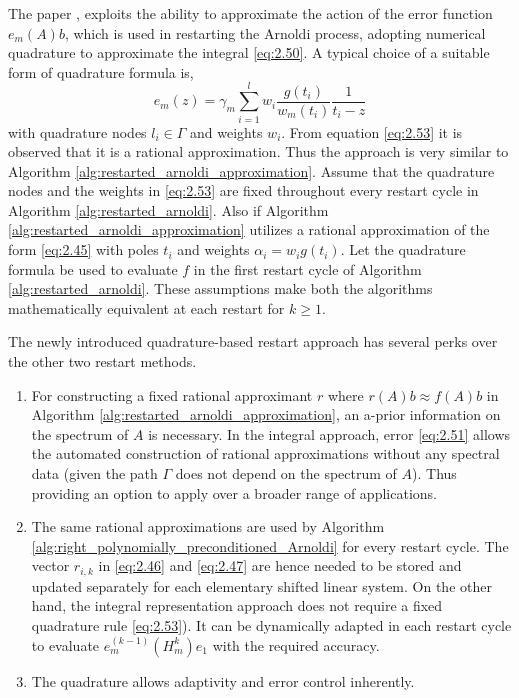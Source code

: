 The paper \cite{52}, exploits the ability to approximate the action of the error function $e_{m}(A)b$, which is used in restarting the Arnoldi process, adopting numerical quadrature to approximate the integral \ref{eq:2.50}. A typical choice of a suitable form of quadrature formula is,
\begin{equation}
    \hat{e}_{m}(z) = \gamma_{m} \sum_{i=1}^{l} w_{i}\frac{ g(t_i)}{w_{m}(t_{i})} \frac{1}{t_{i} - z}
    \label{eq:2.53}
\end{equation}
with quadrature nodes $l_{i}\in\Gamma$ and weights $w_{i}$. From equation \ref{eq:2.53} it is observed that it is a rational approximation. Thus the approach is very similar to Algorithm \ref{alg:restarted_arnoldi_approximation}. Assume that the quadrature nodes and the weights in \ref{eq:2.53} are fixed throughout every restart cycle in Algorithm \ref{alg:restarted_arnoldi}. Also if Algorithm \ref{alg:restarted_arnoldi_approximation} utilizes a rational approximation of the form \ref{eq:2.45} with poles $t_{i}$ and weights $\alpha_{i}=w_{i}g(t_{i})$. Let the quadrature formula be used to evaluate $f$ in the first restart cycle of Algorithm \ref{alg:restarted_arnoldi}. These assumptions make both the algorithms mathematically equivalent at each restart for $k\geq 1$.

The newly introduced quadrature-based restart approach has several perks over the other two restart methods.

\begin{enumerate}
    \item For constructing a fixed rational approximant $r$ where $r(A)b \approx f(A)b$ in Algorithm \ref{alg:restarted_arnoldi_approximation}, an a-prior information on the spectrum of $A$ is necessary. In the integral approach, error \ref{eq:2.51} allows the automated construction of rational approximations without any spectral data (given the path $\Gamma$ does not depend on the spectrum of $A$). Thus providing an option to apply over a broader range of applications.

    \item The same rational approximations are used by Algorithm \ref{alg:right_polynomially_preconditioned_Arnoldi}  for every restart cycle. The vector $r_{i,k}$ in \ref{eq:2.46} and \ref{eq:2.47} are hence needed to be stored and updated separately for each elementary shifted linear system. On the other hand, the integral representation approach does not require a fixed quadrature rule \ref{eq:2.53}). It can be dynamically adapted in each restart cycle to evaluate $e_{m}^{(k-1)}(H_{m}^{k})e_{1}$ with the required accuracy.

    \item The quadrature allows adaptivity and error control inherently.
    
\end{enumerate}


